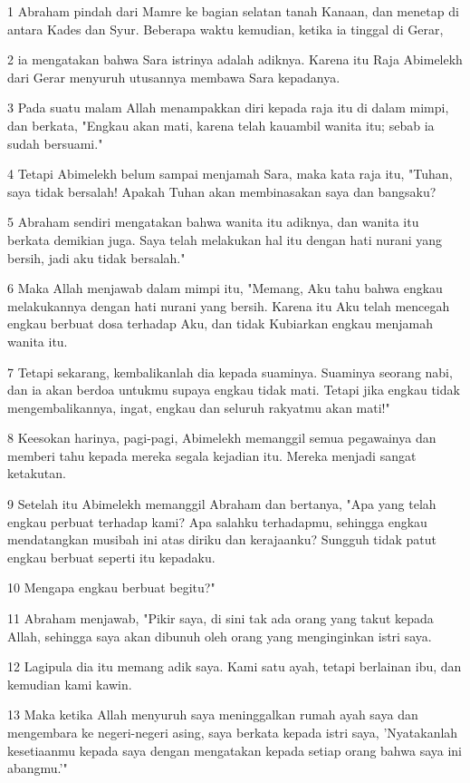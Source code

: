 \par 1 Abraham pindah dari Mamre ke bagian selatan tanah Kanaan, dan menetap di antara Kades dan Syur. Beberapa waktu kemudian, ketika ia tinggal di Gerar,
\par 2 ia mengatakan bahwa Sara istrinya adalah adiknya. Karena itu Raja Abimelekh dari Gerar menyuruh utusannya membawa Sara kepadanya.
\par 3 Pada suatu malam Allah menampakkan diri kepada raja itu di dalam mimpi, dan berkata, "Engkau akan mati, karena telah kauambil wanita itu; sebab ia sudah bersuami."
\par 4 Tetapi Abimelekh belum sampai menjamah Sara, maka kata raja itu, "Tuhan, saya tidak bersalah! Apakah Tuhan akan membinasakan saya dan bangsaku?
\par 5 Abraham sendiri mengatakan bahwa wanita itu adiknya, dan wanita itu berkata demikian juga. Saya telah melakukan hal itu dengan hati nurani yang bersih, jadi aku tidak bersalah."
\par 6 Maka Allah menjawab dalam mimpi itu, "Memang, Aku tahu bahwa engkau melakukannya dengan hati nurani yang bersih. Karena itu Aku telah mencegah engkau berbuat dosa terhadap Aku, dan tidak Kubiarkan engkau menjamah wanita itu.
\par 7 Tetapi sekarang, kembalikanlah dia kepada suaminya. Suaminya seorang nabi, dan ia akan berdoa untukmu supaya engkau tidak mati. Tetapi jika engkau tidak mengembalikannya, ingat, engkau dan seluruh rakyatmu akan mati!"
\par 8 Keesokan harinya, pagi-pagi, Abimelekh memanggil semua pegawainya dan memberi tahu kepada mereka segala kejadian itu. Mereka menjadi sangat ketakutan.
\par 9 Setelah itu Abimelekh memanggil Abraham dan bertanya, "Apa yang telah engkau perbuat terhadap kami? Apa salahku terhadapmu, sehingga engkau mendatangkan musibah ini atas diriku dan kerajaanku? Sungguh tidak patut engkau berbuat seperti itu kepadaku.
\par 10 Mengapa engkau berbuat begitu?"
\par 11 Abraham menjawab, "Pikir saya, di sini tak ada orang yang takut kepada Allah, sehingga saya akan dibunuh oleh orang yang menginginkan istri saya.
\par 12 Lagipula dia itu memang adik saya. Kami satu ayah, tetapi berlainan ibu, dan kemudian kami kawin.
\par 13 Maka ketika Allah menyuruh saya meninggalkan rumah ayah saya dan mengembara ke negeri-negeri asing, saya berkata kepada istri saya, 'Nyatakanlah kesetiaanmu kepada saya dengan mengatakan kepada setiap orang bahwa saya ini abangmu.'"
